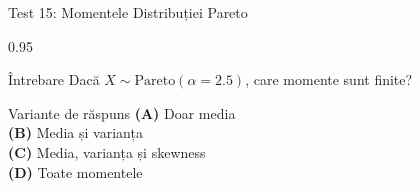 \documentclass[9pt, aspectratio=169, t]{beamer}
\begin{document}
\begin{frame}{Test 15: Momentele Distribuției Pareto}
\begin{cminipage}{0.95\textwidth}
    \begin{alertblock}{Întrebare}
        Dacă $X \sim \text{Pareto}(\alpha = 2.5)$, care momente sunt finite?
    \end{alertblock}

    \vspace{0.5cm}
    \begin{block}{Variante de răspuns}
    \textcolor{MainBlue}{\textbf{(A)}} Doar media\\[3pt]
    \textcolor{MainBlue}{\textbf{(B)}} Media și varianța\\[3pt]
    \textcolor{MainBlue}{\textbf{(C)}} Media, varianța și skewness\\[3pt]
    \textcolor{MainBlue}{\textbf{(D)}} Toate momentele
    \end{block}
\end{cminipage}
\end{frame}
\end{document}
